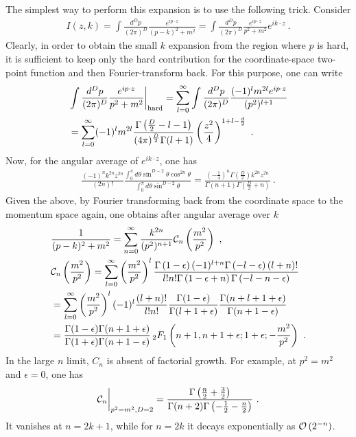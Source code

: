 \documentclass[a4paper,11pt]{article}
\begin{document}
The simplest way to perform this expansion is to use the following trick. Consider
\begin{align}
I(z,k)=\int \frac{d^Dp}{(2\pi)^D}\frac{e^{ip\cdot z}}{(p-k)^2+m^2}= \int \frac{d^Dp}{(2\pi)^D}\frac{e^{ip\cdot z}}{p^2+m^2}e^{ik\cdot z} \ .
\end{align}
Clearly, in order to obtain the small $k$ expansion from the region where $p$ is hard, it is sufficient to keep only the hard contribution for the coordinate-space two-point function and then Fourier-transform back. For this purpose, one can write
\begin{align}
&\int \frac{d^Dp}{(2\pi)^D}\frac{e^{ip\cdot z}}{p^2+m^2}\bigg|_{\rm hard}=\sum_{l=0}^{\infty}\int\frac{d^Dp}{(2\pi)^D}\frac{(-1)^lm^{2l}e^{ip\cdot z}}{(p^2)^{l+1}} \nonumber \\ 
&=\sum_{l=0}^{\infty}(-1)^lm^{2l}\frac{\Gamma\left(\frac{D}{2}-l-1\right)}{(4\pi)^{\frac{D}{2}}\Gamma(l+1)}\left(\frac{z^2}{4}\right)^{1+l-\frac{d}{2}} \ .
\end{align}
Now, for the angular average of $e^{ik\cdot z}$, one has
\begin{align}
\frac{(-1)^nk^{2n}z^{2n}}{(2n)!}\frac{\int_0^{\pi} d\theta \sin^{D-2}\theta\cos^{2n} \theta}{\int_0^{\pi} d\theta \sin^{D-2}\theta}=\frac{\left(-\frac{1}{4}\right)^n \Gamma \left(\frac{D}{2}\right) k^{2 n}z^{2n}}{\Gamma (n+1) \Gamma \left(\frac{D}{2}+n\right)} \ .
\end{align}
Given the above, by Fourier transforming back from the coordinate space to the momentum space again, one obtains after angular average over $k$
\begin{align}
&\frac{1}{(p-k)^2+m^2}=\sum_{n=0}^{\infty}\frac{k^{2n}}{(p^2)^{n+1}}{\cal C}_n \left(\frac{m^2}{p^2}\right) \ , \\ 
&{\cal C}_n\left(\frac{m^2}{p^2}\right)=\sum_{l=0}^{\infty}\left(\frac{m^2}{p^2}\right)^l\frac{\Gamma \left(1-\epsilon\right) (-1)^{l+n} \Gamma \left(-l-\epsilon\right)  (l+n)!}{l! n! \Gamma \left(1-\epsilon+n\right) \Gamma \left(- l-n-\epsilon\right)}\nonumber \\ 
&=\sum_{l=0}^{\infty}\left(\frac{m^2}{p^2}\right)^l(-1)^l\frac{(l+n)!}{l!n!}\frac{\Gamma(1-\epsilon)}{\Gamma(l+1+\epsilon)}\frac{\Gamma(n+l+1+\epsilon)}{\Gamma(n+1-\epsilon)} \nonumber \\ 
&=\frac{\Gamma (1-\epsilon) \Gamma (n+1+\epsilon) }{\Gamma (1+\epsilon) \Gamma (n+1-\epsilon)}\, _2F_1\left(n+1,n+1+\epsilon;1+\epsilon;-\frac{m^2}{p^2}\right) \ . \label{eq:coefmassin}
\end{align}
In the large $n$ limit, $C_n$ is absent of factorial growth. For example, at $p^2=m^2$ and $\epsilon=0$, one has
\begin{align}
{\cal C}_n\bigg|_{p^2=m^2,D=2}=\frac{\Gamma\left(\frac{n}{2}+\frac{3}{2}\right)}{\Gamma(n+2)\Gamma\left(-\frac{1}{2}-\frac{n}{2}\right)} \ .
\end{align}
It vanishes at $n=2k+1$, while for $n=2k$ it decays exponentially as ${\cal O}\left(2^{-n}\right)$. 
\end{document}

